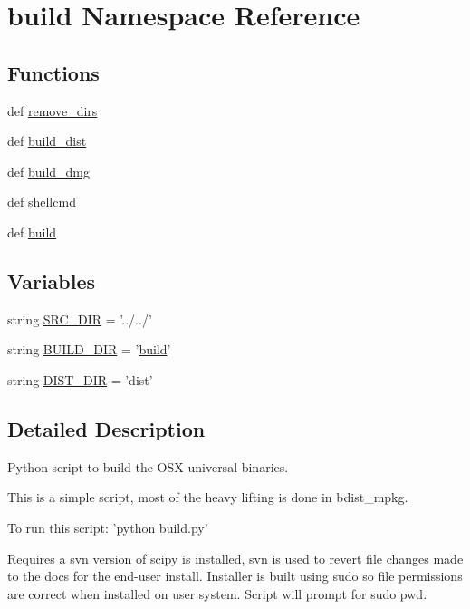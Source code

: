 \hypertarget{namespacebuild}{}\section{build Namespace Reference}
\label{namespacebuild}
\subsection*{Functions}
\begin{DoxyCompactItemize}
\item 
def \hyperlink{namespacebuild_aad154f1e0ce61f270ac47c278e203a0c}{remove\+\_\+dirs}
\item 
def \hyperlink{namespacebuild_a4f650b4a760e1be5606a6d390a42fed3}{build\+\_\+dist}
\item 
def \hyperlink{namespacebuild_aac1f8ffea0b05f4849b4104841938990}{build\+\_\+dmg}
\item 
def \hyperlink{namespacebuild_a12ad0e3e93502a6a3cba7f962da17b73}{shellcmd}
\item 
def \hyperlink{namespacebuild_a5bd27b9663402aefa12d964e7588fc5d}{build}
\end{DoxyCompactItemize}
\subsection*{Variables}
\begin{DoxyCompactItemize}
\item 
string \hyperlink{namespacebuild_a4cbee6faca8fe2ac21aaa8814d4f8479}{S\+R\+C\+\_\+\+D\+I\+R} = '../../'
\item 
string \hyperlink{namespacebuild_a741c41e3a5922e9bfed22f5ee073c113}{B\+U\+I\+L\+D\+\_\+\+D\+I\+R} = '\hyperlink{namespacebuild_a5bd27b9663402aefa12d964e7588fc5d}{build}'
\item 
string \hyperlink{namespacebuild_a6976766b11998456d637ffdaec282a0b}{D\+I\+S\+T\+\_\+\+D\+I\+R} = 'dist'
\end{DoxyCompactItemize}


\subsection{Detailed Description}
\begin{DoxyVerb}Python script to build the OSX universal binaries.

This is a simple script, most of the heavy lifting is done in bdist_mpkg.

To run this script:  'python build.py'

Requires a svn version of scipy is installed, svn is used to revert
file changes made to the docs for the end-user install.  Installer is
built using sudo so file permissions are correct when installed on
user system.  Script will prompt for sudo pwd.\end{DoxyVerb}
 

